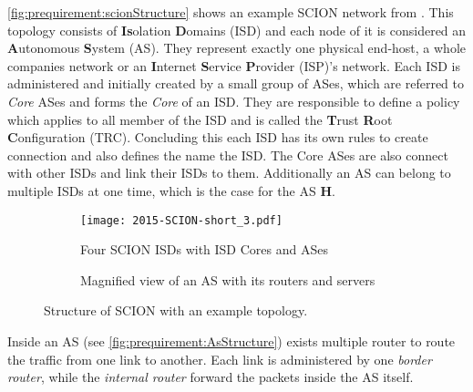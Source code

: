 \documentclass[thesis.tex]{subfiles}
\begin{document}
\autoref{fig:prequirement:scionStructure} shows an example SCION network from \cite{SCIONPaper}. This topology consists of \textbf{Is}olation \textbf{D}omains (ISD) and each node of it is considered an \textbf{A}utonomous \textbf{S}ystem (AS). They represent exactly one physical end-host, a whole companies network or an \textbf{I}nternet \textbf{S}ervice \textbf{P}rovider (ISP)'s network. Each ISD is administered and initially created by a small group of ASes, which are referred to \textit{Core} ASes and forms the \textit{Core} of an ISD. They are responsible to define a policy which applies to all member of the ISD and is called the \textbf{T}rust \textbf{R}oot \textbf{C}onfiguration (TRC). Concluding this each ISD has its own rules to create connection and also defines the name the ISD. The Core ASes are also connect with other ISDs and link their ISDs to them. Additionally an AS can belong to multiple ISDs at one time, which is the case for the AS \textbf{H}.



\begin{figure}[h]
	\centering
	\begin{subfigure}{.48\linewidth}
		\centering
		\texttt{[image: 2015-SCION-short\_3.pdf]}
		\caption{Four SCION ISDs with ISD Cores and ASes \cite{SCIONPaper}}
		\label{fig:prequirement:scionStructure}
	\end{subfigure}
	\hfill
	\begin{subfigure}{0.48\linewidth}
		\centering
		\caption{Magnified view of an AS with its routers and servers \cite{SCIONPaper}}
		\label{fig:prequirement:AsStructure}
	\end{subfigure}
	\caption{Structure of SCION with an example topology.}
	\label{fig:prequirement:structureOfScion}
\end{figure}

Inside an AS (see \autoref{fig:prequirement:AsStructure}) exists multiple router to route the traffic from one link to another. Each link is administered by one \textit{border router}, while the \textit{internal router} forward the packets inside the AS itself.
\end{document}

